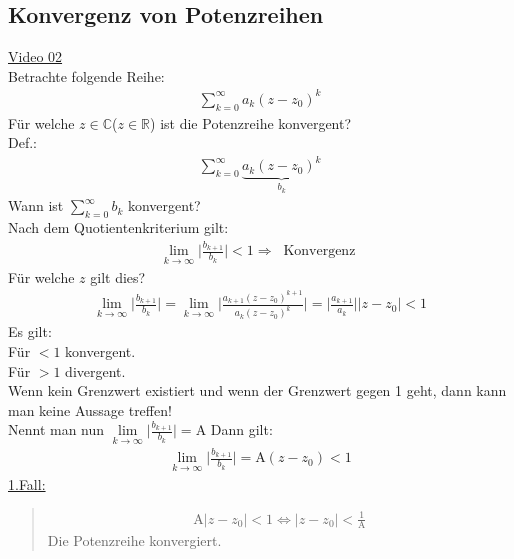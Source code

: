 \subsection{Konvergenz von Potenzreihen}
\href{https://youtu.be/dGwysWKpoE0}{Video 02}\\
Betrachte folgende Reihe:\\
\begin{align*}
	\sum\limits_{k=0}^{\infty}a_k(z-z_0)^k
\end{align*}
Für welche $ z\in \mathbb{C} $($ z\in\mathbb{R} $) ist die Potenzreihe konvergent?\\
Def.:\\
\begin{align*}
	\sum\limits_{k=0}^{\infty}\underbrace {a_k(z-z_0)^k}_{b_k}
\end{align*}
Wann ist $\sum\limits_{k=0}^{\infty}b_k  $ konvergent?\\
Nach dem Quotientenkriterium gilt:\\
\begin{align*}
	\lim\limits_ {k\to\infty}\bigg|\frac{b_{k+1}}{b_k}\bigg|<1\Rightarrow\;\;\text{Konvergenz }
\end{align*}
Für welche $ z $ gilt dies?\\
\begin{align*}
	\lim\limits_{k\to\infty}\bigg|\frac{b_{k+1}}{b_k}\bigg|=\lim\limits_{k\to\infty}\bigg|\frac{a_{k+1}(z-z_0)^{k+1}}{a_k(z-z_0)^k}\bigg|=\bigg|\frac{a_{k+1}}{a_k}\bigg|\big|z-z_0\big|<1
\end{align*}
Es gilt:\\
Für $ <1 $ konvergent.\\
Für $ >1 $ divergent.\\
Wenn kein Grenzwert existiert und wenn der Grenzwert gegen 1 geht, dann kann man keine Aussage treffen!\\
Nennt man nun $ \lim\limits_ {k\to\infty}\bigg|\frac{b_{k+1}}{b_k}\bigg|=\mathrm{A} $
Dann gilt:\\
\begin{align*}
	\lim\limits_ {k\to\infty}\bigg|\frac{b_{k+1}}{b_k}\bigg|=\mathrm{A}(z-z_0)<1
\end{align*}
\underline{1.Fall:}\\
\begin{quote}
	\begin{align*}
		\mathrm{A}|z-z_0|<1\Leftrightarrow |z-z_0|<\frac{1}{\mathrm{A}}
	\end{align*}
	Die Potenzreihe konvergiert.\\
\end{quote}
